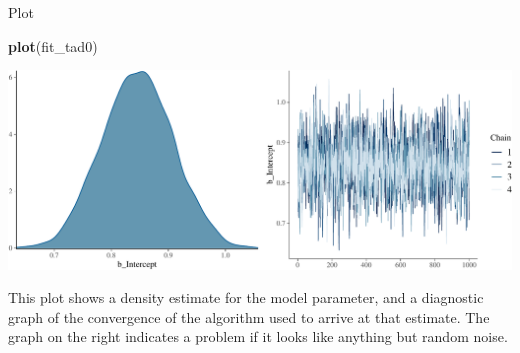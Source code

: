 \documentclass[
  ignorenonframetext,
]{beamer}
\newenvironment{Shaded}{\begin{snugshade}}{\end{snugshade}}
\newcommand{\KeywordTok}[1]{\textcolor[rgb]{0.13,0.29,0.53}{\textbf{#1}}}
\newcommand{\NormalTok}[1]{#1}
\begin{document}
\begin{frame}[fragile]{Plot}
\protect\hypertarget{plot}{}

\scriptsize

\begin{Shaded}
\begin{Highlighting}[]
\KeywordTok{plot}\NormalTok{(fit_tad0)}
\end{Highlighting}
\end{Shaded}

\includegraphics{intro_Bayes_files/figure-beamer/unnamed-chunk-5-1.pdf}

\normalsize

This plot shows a density estimate for the model parameter, and a
diagnostic graph of the convergence of the algorithm used to arrive at
that estimate. The graph on the right indicates a problem if it looks
like anything but random noise.

\end{frame}
\end{document}
